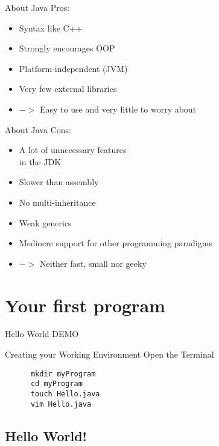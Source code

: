 \begin{frame}{About Java}
	Pros:
	\begin{itemize}
		\item Syntax like C++
		\item Strongly encourages OOP
		\item Platform-independent (JVM)
		\item Very few external libraries
		\item[] $->$ Easy to use and very little to worry about
	\end{itemize}
\end{frame}

\begin{frame}{About Java}
	Cons:
	\begin{itemize}
		\item A lot of unnecessary features \\ in the JDK
		\item Slower than assembly
		\item No multi-inheritance
		\item Weak generics
		\item Mediocre support for other programming paradigms
		\item[] $->$ Neither fast, small nor geeky
	\end{itemize}
\end{frame}

\section{Your first program}
\begin{frame}{Hello World}
  DEMO
\end{frame}

\begin{frame}[fragile]{Creating your Working Environment}
  Open the Terminal
  \begin{lstlisting}
      mkdir myProgram
      cd myProgram
      touch Hello.java
      vim Hello.java
  \end{lstlisting}
\end{frame}

\subsection{Hello World!}


